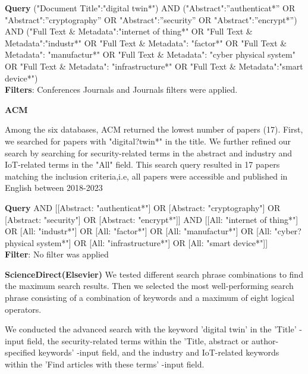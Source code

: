 \begin{tcolorbox}[colback=black!5!white, sharp corners=all, colframe=white!95!black]
\textbf{Query}
\tcblower
("Document Title":"digital twin*") AND ("Abstract":”authenticat*” OR "Abstract":”cryptography” OR "Abstract":”security” OR "Abstract":”encrypt*”) AND ("Full Text \& Metadata":"internet of thing*" OR "Full Text \& Metadata":"industr*" OR "Full Text \& Metadata": "factor*" OR "Full Text \& Metadata": "manufactur*" OR "Full Text \& Metadata": "cyber physical system" OR "Full Text \& Metadata": "infrastructure*" OR "Full Text \& Metadata":"smart device*")  \\

\textbf{Filters}: Conferences Journals and Journals filters were applied. 
\end{tcolorbox}

\textbf{ACM}

Among the six databases, ACM returned the lowest number of papers (17). First, we searched for papers with "digital?twin*" in the title. We further refined our search by searching for security-related terms in the abstract and industry and IoT-related terms in the "All" field. This search query resulted in 17 papers matching the inclusion criteria,i.e, all papers were accessible and published in English between 2018-2023

\begin{tcolorbox}[colback=black!5!white, sharp corners=all, colframe=white!95!black]
\textbf{Query}
 AND [[Abstract: "authenticat*"] OR [Abstract: "cryptography"] OR [Abstract: "security"] OR [Abstract: "encrypt*"]] AND [[All: "internet of thing*"] OR [All: "industr*"] OR [All: "factor*"] OR [All: "manufactur*"] OR [All: "cyber?physical system*"] OR [All: "infrastructure*"] OR [All: "smart device*"]]\\

\textbf{Filter}: No filter was applied

\end{tcolorbox}


\textbf{ScienceDirect(Elsevier)}
We tested different search phrase combinations to find the maximum search results. Then we selected the most well-performing search phrase consisting of a combination of keywords and a maximum of eight logical operators.

We conducted the advanced search with the keyword ’digital twin’  in the ’Title’ -input field, the security-related terms within the ’Title, abstract or author-specified keywords’ -input field, and the industry and IoT-related keywords within the ’Find articles with these terms’ -input field.

